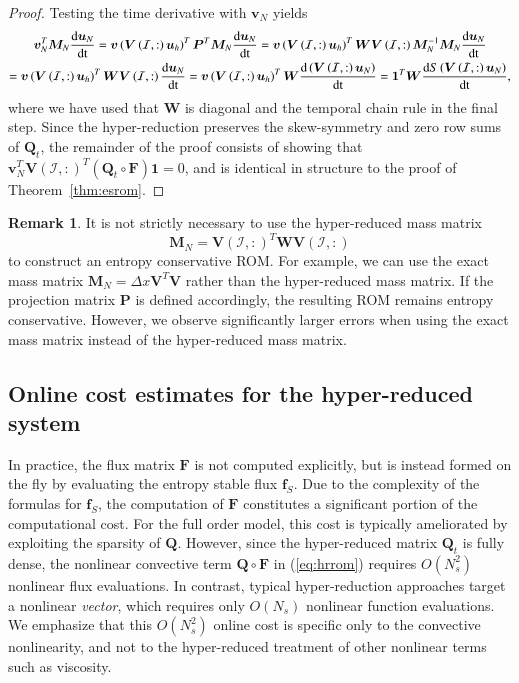 \documentclass[preprint,10pt]{elsarticle}
\theoremstyle{definition}
\theoremstyle{lemma}
\newtheorem*{remark}{Remark}
\theoremstyle{theorem}
\theoremstyle{assumption}
\newcommand{\td}[2]{\frac{{\rm d}#1}{{\rm d}{\rm #2}}}
\newcommand{\LRp}[1]{\left( #1 \right)}
\begin{document}
\begin{proof}
Testing the time derivative with $\bm{v}_N$ yields
\begin{gather*}
\bm{v}_N^T\bm{M}_N\td{\bm{u}_N}{t} = \bm{v}\LRp{\bm{V}\LRp{\mathcal{I},:}\bm{u}_h}^T\bm{P}^T\bm{M}_N\td{\bm{u}_N}{t} = \bm{v}\LRp{\bm{V}\LRp{\mathcal{I},:}\bm{u}_h}^T \bm{W}\bm{V}\LRp{\mathcal{I},:}\bm{M}_N^{-1}\bm{M}_N\td{\bm{u}_N}{t}
\\
= \bm{v}\LRp{\bm{V}\LRp{\mathcal{I},:}\bm{u}_h}^T \bm{W} \bm{V}\LRp{\mathcal{I},:}\td{\bm{u}_N}{t} = \bm{v}\LRp{\bm{V}\LRp{\mathcal{I},:}\bm{u}_h}^T \bm{W} \td{\LRp{\bm{V}\LRp{\mathcal{I},:}\bm{u}_N}}{t} = \bm{1}^T\bm{W}\td{S\LRp{\bm{V}\LRp{\mathcal{I},:}\bm{u}_N}}{t},
\end{gather*}
where we have used that $\bm{W}$ is diagonal and the temporal chain rule in the final step.  
Since the hyper-reduction preserves the skew-symmetry and zero row sums of $\bm{Q}_t$, the remainder of the proof consists of showing that $\bm{v}_N^T\bm{V}\LRp{\mathcal{I},:}^T\LRp{\bm{Q}_t \circ \bm{F}}\bm{1} = 0$, and is identical in structure to the proof of Theorem~\ref{thm:esrom}.  
\end{proof}

\begin{remark}
It is not strictly necessary to use the hyper-reduced mass matrix 
\[
\bm{M}_N = \bm{V}\LRp{\mathcal{I},:}^T\bm{W}\bm{V}\LRp{\mathcal{I},:}
\]
 to construct an entropy conservative ROM.  For example, we can use the exact mass matrix $\bm{M}_N = \Delta x \bm{V}^T\bm{V}$ rather than the hyper-reduced mass matrix.  If the projection matrix $\bm{P}$ is defined accordingly, the resulting ROM remains entropy conservative.  However, we observe significantly larger errors when using the exact mass matrix instead of the hyper-reduced mass matrix.  
\end{remark}

\subsection{Online cost estimates for the hyper-reduced system}
\label{sec:cost}
In practice, the flux matrix $\bm{F}$ is not computed explicitly, but is instead formed on the fly by evaluating the entropy stable flux $\bm{f}_S$.  Due to the complexity of the formulas for $\bm{f}_S$, the computation of $\bm{F}$ constitutes a significant portion of the computational cost.  For the full order model, this cost is typically ameliorated by exploiting the sparsity of $\bm{Q}$.  However, since the hyper-reduced matrix $\bm{Q}_t$ is fully dense, the nonlinear convective term $\bm{Q}\circ\bm{F}$ in (\ref{eq:hrrom}) requires $O(N_s^2)$ nonlinear flux evaluations.  In contrast, typical hyper-reduction approaches target a nonlinear \textit{vector}, which requires only $O(N_s)$ nonlinear function evaluations.  We emphasize that this $O(N_s^2)$ online cost is specific only to the convective nonlinearity, and not to the hyper-reduced treatment of other nonlinear terms such as viscosity.
\end{document}
